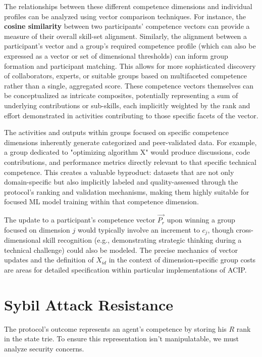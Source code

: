 \documentclass{article}
\begin{document}
\begin{CJK}{UTF8}{gbsn}
        The relationships between these different competence dimensions and individual profiles can be analyzed using vector comparison techniques. For instance, the \textbf{cosine similarity} between two participants' competence vectors can provide a measure of their overall skill-set alignment. Similarly, the alignment between a participant's vector and a group's required competence profile (which can also be expressed as a vector or set of dimensional thresholds) can inform group formation and participant matching. This allows for more sophisticated discovery of collaborators, experts, or suitable groups based on multifaceted competence rather than a single, aggregated score. These competence vectors themselves can be conceptualized as intricate composites, potentially representing a sum of underlying contributions or sub-skills, each implicitly weighted by the rank and effort demonstrated in activities contributing to those specific facets of the vector.

            {{The activities and outputs within groups focused on specific competence dimensions inherently generate categorized and peer-validated data. For example, a group dedicated to "optimizing algorithm X" would produce discussions, code contributions, and performance metrics directly relevant to that specific technical competence. This creates a valuable byproduct: datasets that are not only domain-specific but also implicitly labeled and quality-assessed through the protocol's ranking and validation mechanisms, making them highly suitable for focused ML model training within that competence dimension.}}

        The update to a participant's competence vector $\vec{P_r}$ upon winning a group focused on dimension $j$ would typically involve an increment to $c_j$, though cross-dimensional skill recognition (e.g., demonstrating strategic thinking during a technical challenge) could also be modeled. The precise mechanics of vector updates and the definition of $X_{id}$ in the context of dimension-specific group costs are areas for detailed specification within particular implementations of ACIP.

        \section{Sybil Attack Resistance}

        The protocol's outcome represents an agent's competence by storing his $R$ rank in the state trie. To ensure this representation isn't manipulatable, we must analyze security concerns.


\end{CJK}
\end{document}

